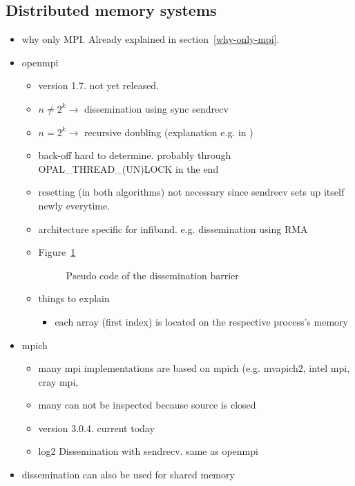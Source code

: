 \documentclass[a4paper, 10pt]{article}
\begin{document}
\subsection{Distributed memory systems}
\begin{itemize}
	\item why only MPI. Already explained in section~\ref{why-only-mpi}.
	\item openmpi
		\begin{itemize}
			\item version 1.7. not yet released.
			\item $n \neq 2^k \rightarrow$ dissemination\cite{hensgen1988} using sync sendrecv
			\item $n = 2^k \rightarrow$ recursive doubling (explanation e.g. in \cite{hoefler2005})
			\item back-off hard to determine. probably through OPAL\_THREAD\_(UN)LOCK in the end
			\item resetting (in both algorithms) not necessary since sendrecv sets up itself newly everytime.
			\item architecture specific for infiband. e.g. dissemination using RMA \cite{hoefler2006a}
			\item Figure~\ref{fig:dissemination-no-reset}
				\begin{figure}[htbp]
					\centering
					
					\caption{Pseudo code of the dissemination barrier}
					\label{fig:dissemination-no-reset}
				\end{figure}
			\item things to explain
				\begin{itemize}
					\item each array (first index) is located on the respective process's memory
				\end{itemize}

		\end{itemize}
	\item mpich
		\begin{itemize}
			\item many mpi implementations are based on mpich (e.g. mvapich2, intel mpi, cray mpi,
			\item many can not be inspected because source is closed
			\item version 3.0.4. current today
			\item log2 Dissemination with sendrecv. same as openmpi
		\end{itemize}
	\item dissemination can also be used for shared memory\cite{hoefler2013}
\end{itemize}
\end{document}
